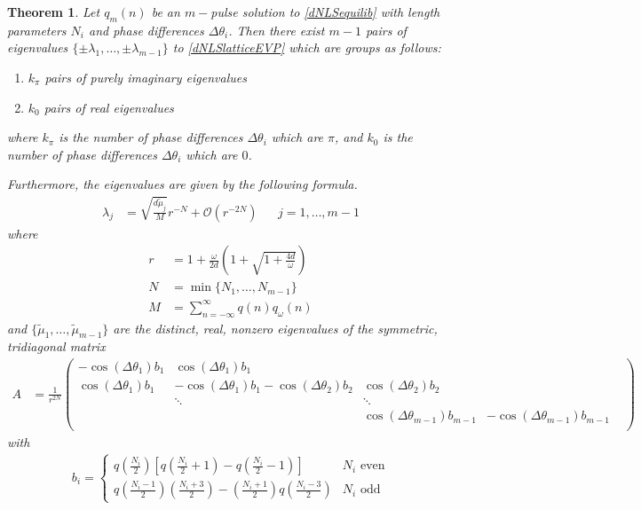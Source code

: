\documentclass[12pt]{article}
\newtheorem{theorem}{Theorem}
\begin{document}
\begin{theorem}
Let $q_m(n)$ be an $m-$pulse solution to \eqref{dNLSequilib} with length parameters $N_i$ and phase differences $\Delta\theta_i$. Then there exist $m-1$ pairs of eigenvalues $\{\pm \lambda_1, \dots, \pm \lambda_{m-1}\}$ to \eqref{dNLSlatticeEVP} which are groups as follows:
\begin{enumerate}
	\item $k_\pi$ pairs of purely imaginary eigenvalues
	\item $k_0$ pairs of real eigenvalues
\end{enumerate}
where $k_\pi$ is the number of phase differences $\Delta\theta_i$ which are $\pi$, and $k_0$ is the number of phase differences $\Delta\theta_i$ which are $0$.

Furthermore, the eigenvalues are given by the following formula.
\begin{align}\label{eigsDNLS}
\lambda_j &= \sqrt{\frac{d \tilde{\mu}_j}{M}}r^{-N} + \mathcal{O}(r^{-2N}) && j = 1, \dots, m-1
\end{align}
where 
\begin{align*}
r &= 1 + \frac{\omega}{2 d} \left( 1 + \sqrt{1 + \frac{4 d}{\omega}} \right)\\
N &= \min\{ N_1, \dots, N_{m-1} \} \\
M &= \sum_{n=-\infty}^\infty q(n) q_\omega(n)
\end{align*}
and $\{ \tilde{\mu}_1, \dots, \tilde{\mu}_{m-1} \}$ are the distinct, real, nonzero eigenvalues of the symmetric, tridiagonal matrix
\begin{align*}
A &= \frac{1}{r^{2N}}\begin{pmatrix}
-\cos(\Delta\theta_1) b_1 & \cos(\Delta\theta_1) b_1 & & &  \\
\cos(\Delta\theta_1) b_1 & -\cos(\Delta\theta_1) b_1 - \cos(\Delta\theta_2) b_2 & \cos(\Delta\theta_2) b_2 \\
& \ddots & \ddots \\
& &  \cos(\Delta\theta_{m-1}) b_{m-1} & -\cos(\Delta\theta_{m-1}) b_{m-1}  \\
\end{pmatrix}
\end{align*}
with
\begin{align*}
b_i = \begin{cases}
q\left(\frac{N_i}{2}\right) \left[ q\left(\frac{N_i}{2} + 1\right) - q\left(\frac{N_i}{2} - 1\right) \right] & N_i \text{ even} \\
q\left(\frac{N_i-1}{2}\right)\left(\frac{N_i+3}{2}\right) 
- \left(\frac{N_i+1}{2}\right)q\left(\frac{N_i-3}{2}\right) & N_i \text{ odd}
\end{cases}
\end{align*}
\end{theorem}
\end{document}
